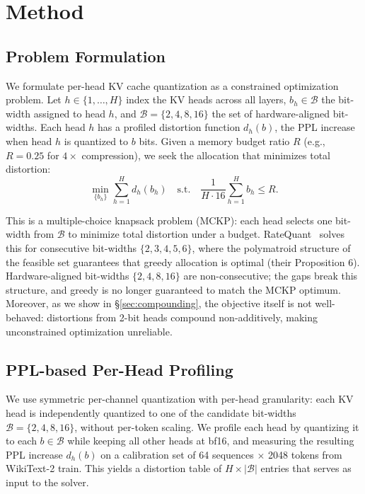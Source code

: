 \section{Method}
\label{sec:method}

\subsection{Problem Formulation}
\label{sec:formulation}

We formulate per-head KV cache quantization as a constrained optimization problem.
Let $h \in \{1,\ldots,H\}$ index the KV heads across all layers, $b_h \in \mathcal{B}$ the bit-width assigned to head $h$, and $\mathcal{B} = \{2, 4, 8, 16\}$ the set of hardware-aligned bit-widths.
Each head $h$ has a profiled distortion function $d_h(b)$, the PPL increase when head $h$ is quantized to $b$ bits.
Given a memory budget ratio $R$ (e.g., $R = 0.25$ for $4\times$ compression), we seek the allocation that minimizes total distortion:
\begin{equation}
\label{eq:objective}
\min_{\{b_h\}} \sum_{h=1}^{H} d_h(b_h) \quad \text{s.t.} \quad \frac{1}{H \cdot 16}\sum_{h=1}^{H} b_h \leq R.
\end{equation}

This is a multiple-choice knapsack problem (MCKP): each head selects one bit-width from $\mathcal{B}$ to minimize total distortion under a budget.
RateQuant~\cite{zuo2026ratequant} solves this for consecutive bit-widths $\{2,3,4,5,6\}$, where the polymatroid structure of the feasible set guarantees that greedy allocation is optimal (their Proposition 6).
Hardware-aligned bit-widths $\{2,4,8,16\}$ are non-consecutive; the gaps break this structure, and greedy is no longer guaranteed to match the MCKP optimum.
Moreover, as we show in \S\ref{sec:compounding}, the objective itself is not well-behaved: distortions from 2-bit heads compound non-additively, making unconstrained optimization unreliable.

\subsection{PPL-based Per-Head Profiling}
\label{sec:profiling}

We use symmetric per-channel quantization with per-head granularity: each KV head is independently quantized to one of the candidate bit-widths $\mathcal{B} = \{2, 4, 8, 16\}$, without per-token scaling.
We profile each head by quantizing it to each $b \in \mathcal{B}$ while keeping all other heads at bf16, and measuring the resulting PPL increase $d_h(b)$ on a calibration set of 64 sequences $\times$ 2048 tokens from WikiText-2 train.
This yields a distortion table of $H \times |\mathcal{B}|$ entries that serves as input to the solver.

